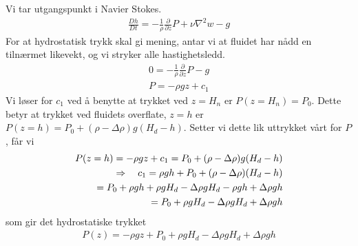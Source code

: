 \documentclass[12p,a4paper]{article}
\begin{document}
\subsubsection{}
Vi tar utgangspunkt i Navier Stokes.
\begin{align*}
    \frac{Dh}{Dt} = -\frac{1}{\rho}\frac{\partial}{\partial z} P + \nu \nabla^2 w - g
\end{align*}
For at hydrostatisk trykk skal gi mening, antar vi at fluidet har nådd en tilnærmet likevekt, og vi stryker alle hastighetsledd.
\begin{align*}
    0 = -\frac{1}{\rho}\frac{\partial}{\partial z} P - g \\
    P = - \rho g z + c_1
\end{align*}
Vi løser for $c_1$ ved å benytte at trykket ved $z=H_n$ er $P(z=H_n) = P_0$. Dette betyr at trykket ved fluidets overflate, $z=h$ er $P(z=h) = P_0 + (\rho - \Delta\rho)g(H_d - h)$. Setter vi dette lik uttrykket vårt for $P$, får vi
\begin{align*}
    P(z=h) = - \rho g z + c_1 = P_0 + \qty(\rho - \Delta\rho)g(H_d - h) \\
    \Rightarrow \quad c_1 = \rho g h + P_0 + \qty(\rho - \Delta\rho)(H_d - h)\\
    = P_0 + \rho g h + \rho g H_d - \Delta\rho g H_d - \rho g h + \Delta\rho g h\\
    = P_0 + \rho g H_d - \Delta\rho g H_d + \Delta\rho g h
\end{align*}
som gir det hydrostatiske trykket
\begin{align}\label{eqn:hydrostatic}
    P(z) = -\rho g z + P_0 + \rho g H_d - \Delta\rho g H_d + \Delta\rho g h
\end{align}
\end{document}
